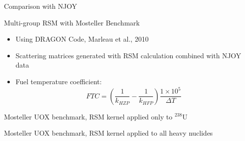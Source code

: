 \documentclass[sans,mathserif,aspectratio=169]{beamer}
\begin{document}
\begin{frame}{Comparison with NJOY}
\centering
{}
\end{frame}

\begin{frame}{Multi-group RSM with Mosteller Benchmark}
\begin{itemize}
\item Using DRAGON Code, Marleau et al., 2010 \pause
\item Scattering matrices generated with RSM calculation combined with NJOY data \pause
\item Fuel temperature coefficient:
\begin{equation*}
FTC = \left(\frac{1}{k_{HZP}} - \frac{1}{k_{HFP}} \right) \frac{1\times 10^5}{\Delta T}
\end{equation*}
\end{itemize}
\end{frame}

\begin{frame}{Mosteller UOX benchmark, RSM kernel applied only to $^{238}$U}
\centering
{}
\end{frame}

\begin{frame}{Mosteller UOX benchmark, RSM kernel applied to all heavy nuclides}
\centering
{}
\end{frame}
\end{document}

